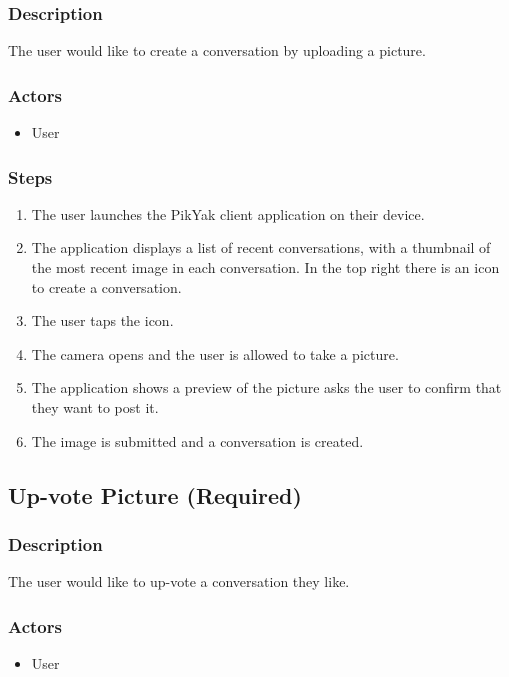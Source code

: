\documentclass[11pt]{scrartcl}
\begin{document}
        \subsubsection{Description}
            The user would like to create a conversation by uploading a picture.
        \subsubsection{Actors}
            \begin{itemize}
                \item User
            \end{itemize}
        \subsubsection{Steps}
            \begin{enumerate}
                \item The user launches the PikYak client application on their device.
                \item The application displays a list of recent conversations, with a thumbnail of the most recent image in each conversation. In the top right there is an icon to create a conversation.
                \item The user taps the icon.
                \item The camera opens and the user is allowed to take a picture.
                \item The application shows a preview of the picture asks the user to confirm that they want to post it.
                \item The image is submitted and a conversation is created.
            \end{enumerate}
    
    \subsection{Up-vote Picture (Required)}
    \label{sec:upvote}
        \subsubsection{Description}
            The user would like to up-vote a conversation they like.
        \subsubsection{Actors}
            \begin{itemize}
                \item User
            \end{itemize}
\end{document}
